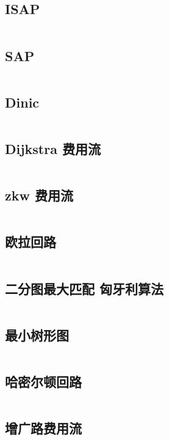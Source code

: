 \documentclass[titlepage,landscape,a4paper,10pt]{article}
\begin{document}
\begin{multicols}{2}
\begin{spacing}{0.8}
\subsection{ISAP}
\inputminted{cpp}{Graph/ISAP.cpp}

\subsection{SAP}
\inputminted{cpp}{Graph/SAP.cpp}

\subsection{Dinic}
\inputminted{cpp}{Graph/dinic.cpp}

\subsection{Dijkstra 费用流}
\inputminted{cpp}{Graph/MinCostFlow.cpp}

\subsection{zkw 费用流}
\inputminted{cpp}{Graph/zkw费用流.cpp}

\subsection{欧拉回路}
\inputminted{cpp}{Graph/欧拉回路.cpp}

\subsection{二分图最大匹配 匈牙利算法}
\inputminted{cpp}{Graph/匈牙利算法.cpp}

\subsection{最小树形图}
\inputminted{cpp}{Graph/朱刘.cpp}

\subsection{哈密尔顿回路}
\inputminted{cpp}{Graph/哈密尔顿回路.cpp}

\subsection{增广路费用流}
\inputminted{cpp}{Graph/增广路费用流.cpp}


\end{spacing}
\end{multicols}
\end{document}
